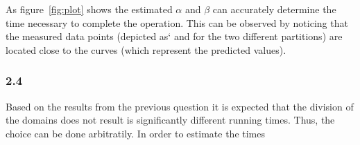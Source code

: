 As figure~\ref{fig:plot} shows the estimated $\alpha$ and $\beta$ can accurately determine the time necessary to complete the operation. This can be observed by noticing that the measured data points (depicted as`
and
for the two different partitions)
are located close to the curves (which represent the predicted values).


\subsubsection{2.4}

Based on the results from the previous question it is expected that the division of the domains does not result is significantly different running times. Thus, the choice can be done arbitratily. In order to estimate the times



